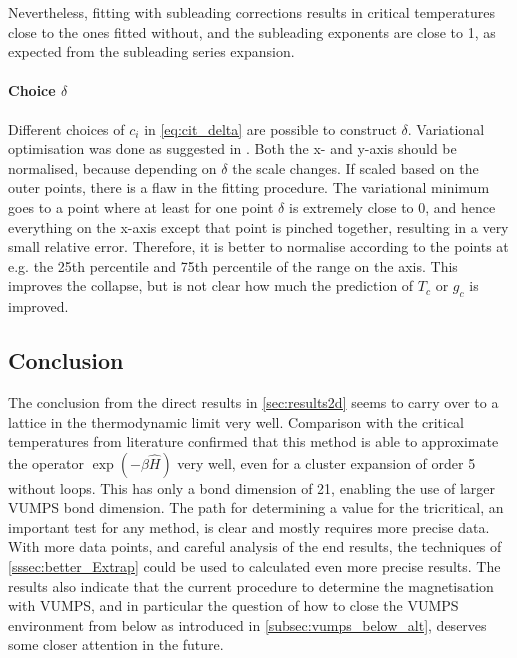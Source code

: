 Nevertheless, fitting with subleading corrections results in critical temperatures close to the ones fitted without, and the subleading exponents are close to 1, as expected from the subleading series expansion.

\paragraph{ Choice  $\delta$  }

Different choices of $c_i$ in \cref{eq:cit_delta} are possible to construct $\delta$.  Variational optimisation was done as suggested in \cite{Nietner2020}. Both the x- and y-axis should be normalised, because depending on $\delta$ the scale changes. If scaled based on the outer points, there is a flaw in the fitting procedure.  The variational minimum goes to a point where at least for one point $\delta$ is extremely close to 0, and hence everything on the x-axis except that point is pinched together, resulting in a very small relative error. Therefore, it is better to normalise according to the points at e.g. the 25th percentile and 75th percentile of the range on the  axis. This improves the collapse, but is not clear how much the prediction of $T_c$ or $g_c$ is improved.

\subsection{Conclusion}

The conclusion from the direct results in \cref{sec:results2d} seems to carry over to a lattice in the thermodynamic limit very well. Comparison with the critical temperatures from literature confirmed that this method is able to approximate the operator $\exp(-\beta \hat{H})$ very well, even for a cluster expansion of order 5 without loops. This has only a bond dimension of 21, enabling the use of larger \Gls{VUMPS} bond dimension.
The path for determining a value for the tricritical, an important test for any method, is clear and mostly requires more precise data. With more data points, and careful analysis of the end results, the techniques of \cref{sssec:better_Extrap} could be used to calculated even more precise results.
The results also indicate that the current procedure to determine the magnetisation with \Gls{VUMPS}, and in particular the question of how to close the \Gls{VUMPS} environment from below as introduced in \cref{subsec:vumps_below_alt}, deserves some closer attention in the future.